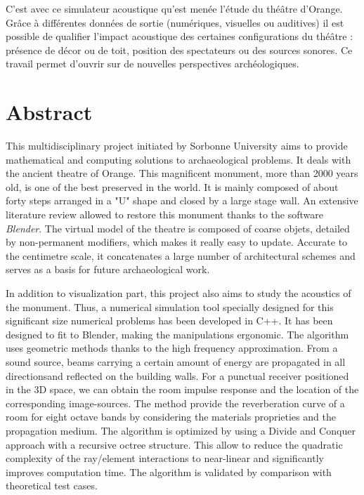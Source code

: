 C'est avec ce simulateur acoustique qu'est menée l'étude du théâtre d'Orange. Grâce à différentes données de sortie (numériques, visuelles ou auditives) il est possible de qualifier l'impact acoustique des certaines configurations du théâtre : présence de décor ou de toit, position des spectateurs ou des sources sonores. Ce travail permet d'ouvrir sur de nouvelles perspectives archéologiques.



\chapter*{Abstract}
This multidisciplinary project initiated by Sorbonne University aims to provide mathematical and computing solutions to archaeological problems. It deals with the ancient theatre of Orange. This magnificent monument, more than 2000 years old, is one of the best preserved in the world. It is mainly composed of about forty steps arranged in a "U" shape and closed by a large stage wall. An extensive literature review allowed to restore this monument thanks to the software \textit{Blender}. The virtual model of the theatre is composed of coarse objets, detailed by non-permanent modifiers, which makes it really easy to update. Accurate to the centimetre scale, it concatenates a large number of architectural schemes and serves as a basis for future archaeological work.

In addition to visualization part, this project also aims to study the acoustics of the monument. Thus, a numerical simulation tool specially designed for this significant size numerical problems has been developed in C++. It has been designed to fit to Blender, making the manipulations ergonomic. The algorithm uses geometric methods thanks to the high frequency approximation. From a sound source, beams carrying a certain amount of energy are propagated in all directionsand reflected on the building walls. For a punctual receiver positioned in the 3D space, we can obtain the room impulse response and the location of the corresponding image-sources. The method provide the reverberation curve of a room for eight octave bands by considering the materials proprieties and the propagation medium. The algorithm is optimized by using a Divide and Conquer approach with a recursive octree structure. This allow to reduce the quadratic complexity of the ray/element interactions to near-linear and significantly improves computation time. The algorithm is validated by comparison with theoretical test cases.
 

